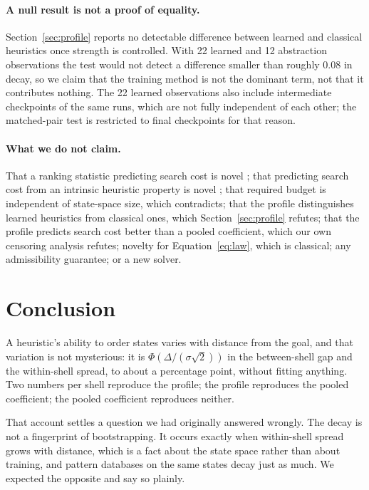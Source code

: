 \documentclass{article}
\begin{document}
\paragraph{A null result is not a proof of equality.} Section~\ref{sec:profile}
reports no detectable difference between learned and classical heuristics once
strength is controlled. With 22 learned and 12 abstraction observations the test
would not detect a difference smaller than roughly $0.08$ in decay, so we claim
that the training method is not the dominant term, not that it contributes
nothing. The 22 learned observations also include intermediate checkpoints of the
same runs, which are not fully independent of each other; the matched-pair test is
restricted to final checkpoints for that reason.

\paragraph{What we do not claim.} That a ranking statistic predicting search cost
is novel \citep{wilt2016}; that predicting search cost from an intrinsic
heuristic property is novel \citep{korf2001}; that required budget is independent
of state-space size, which \citet{korf2001} contradicts; that the profile
distinguishes learned heuristics from classical ones, which
Section~\ref{sec:profile} refutes; that the profile predicts search cost better
than a pooled coefficient, which our own censoring analysis refutes; novelty for
Equation~\ref{eq:law}, which is classical; any admissibility guarantee; or a new
solver.

\section{Conclusion}

A heuristic's ability to order states varies with distance from the goal, and
that variation is not mysterious: it is $\Phi(\Delta/(\sigma\sqrt{2}))$ in the
between-shell gap and the within-shell spread, to about a percentage point,
without fitting anything. Two numbers per shell reproduce the profile; the
profile reproduces the pooled coefficient; the pooled coefficient reproduces
neither.

That account settles a question we had originally answered wrongly. The decay is
not a fingerprint of bootstrapping. It occurs exactly when within-shell spread
grows with distance, which is a fact about the state space rather than about
training, and pattern databases on the same states decay just as much. We
expected the opposite and say so plainly.
\end{document}
